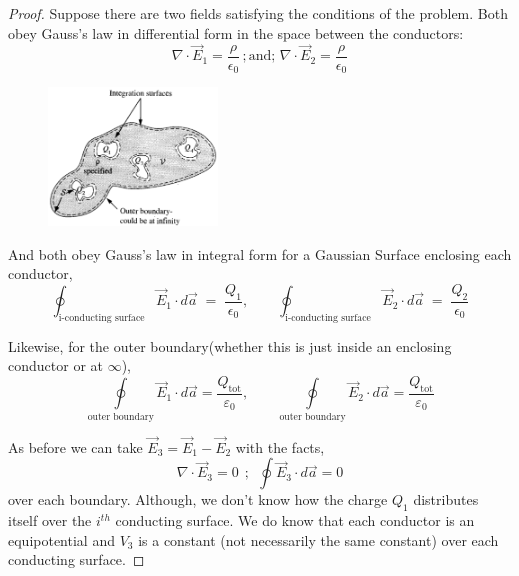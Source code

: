 \documentclass{article}
\begin{document}
\begin{proof}
    Suppose there are two fields satisfying the conditions of the problem. Both obey Gauss's law in differential form in the space between the conductors:
      $$
    \nabla \cdot \vec{E}_1 = \frac{\rho}{\epsilon_0} \, ;\text{and}; \, \nabla\cdot \vec{E}_2 = \frac{\rho}{\epsilon_0}
    $$
        \begin{figure}[H]
        \centering
        \includegraphics[width=0.4\textwidth]{Images/griff_2nd_unq.png}
        \caption{}
        \label{griff_2nd_unq}
        \end{figure}
    And both obey Gauss's law in integral form for a Gaussian Surface enclosing each conductor,
    \[
    \oint_{\text{i-conducting surface}} \vec{E}_1\cdot d\vec{a} \;=\; \frac{Q_1}{\epsilon_0}, \qquad
    \oint_{\text{i-conducting surface}} \vec{E}_2\cdot d\vec{a} \;=\; \frac{Q_2}{\epsilon_0}
    \]

    Likewise, for the outer boundary(whether this is just inside an enclosing conductor or at $\infty$),
    \[
    \oint\limits_{\text{outer boundary}} \vec{E}_1 \cdot d\vec{a} 
    = \frac{Q_{\text{tot}}}{\varepsilon_0},
    \qquad
    \oint\limits_{\text{outer boundary}} \vec{E}_2 \cdot d\vec{a} 
    = \frac{Q_{\text{tot}}}{\varepsilon_0}
    \]

    As before we can take $\vec{E}_3 = \vec{E}_1 - \vec{E}_2$ with the facts,
    \[
    \nabla \cdot \vec{E}_3 = 0 \ \ ; \ \ \oint\vec{E}_3\cdot d\vec{a}=0
    \]
    over each boundary.  Although, we don't know how the charge $Q_1$ distributes itself over the $i^{th}$ conducting surface.  We do know that each conductor is an equipotential and $V_3$ is a constant (not necessarily the same constant) over each conducting surface. 


\end{proof}
\end{document}
